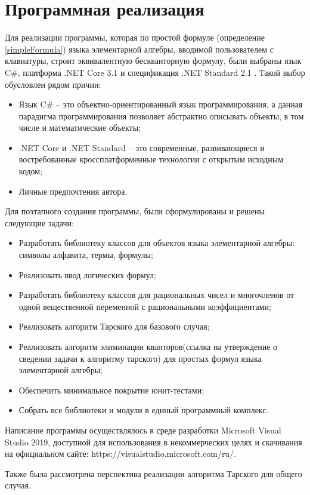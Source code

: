 \section{Программная реализация}

Для реализации программы, которая по простой формуле (определение \ref{simpleFormula}) языка элементарной алгебры, вводимой пользователем с клавиатуры, строит эквивалентную бескванторную формулу, были выбраны язык C\#, платформа .NET Core 3.1 и спецификация .NET Standard 2.1 \cite{TroelsonNet}. Такой выбор обусловлен рядом причин:
\begin{itemize}
    \item Язык C\# -- это объектно-ориентированный язык программирования, а данная парадигма программирования позволяет абстрактно описывать объекты, в том числе и математические объекты; 
    \item .NET Core и .NET Standard -- это современные, развивающиеся и востребованные кроссплатформенные технологии с открытым исходным кодом;
    \item Личные предпочтения автора.
\end{itemize}
Для поэтапного создания программы, были сформулированы и решены следующие задачи:
\begin{itemize}
    \item Разработать библиотеку классов для объектов языка элементарной алгебры: символы алфавита, термы, формулы;
    \item Реализовать ввод логических формул;
    \item Разработать библиотеку классов для рациональных чисел и многочленов от одной вещественной переменной с рациональными коэффициентами;
    \item Реализовать алгоритм Тарского для базового случая;
    \item Реализовать алгоритм элиминации кванторов(ссылка на утверждение о сведении задачи к алгоритму тарского) для простых формул языка элементарной алгебры;
    \item Обеспечить минимальное покрытие юнит-тестами;
    \item Собрать все библиотеки и модули в единый программный комплекс.
\end{itemize}
Написание программы осуществлялось в среде разработки Microsoft Visual Studio 2019, доступной для использования в некоммерческих целях и скачивания на официальном сайте: https://visualstudio.microsoft.com/ru/.

Также была рассмотрена перспектива реализации алгоритма Тарского для общего случая. 

